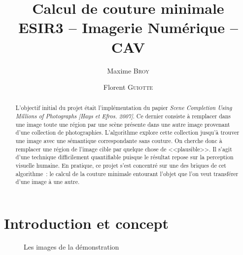 \documentclass[a4paper]{article}
\title{Calcul de couture minimale \\ {\large ESIR3 -- Imagerie Numérique -- CAV}}
\author{Maxime \textsc{Broy} \and Florent \textsc{Guiotte}}
\begin{document}
\maketitle 
\begin{abstract}
L'objectif initial du projet était l'implémentation du papier {\em Scene Completion Using Millions of Photographs [Hays et Efros. 2007]}. 
Ce dernier consiste à remplacer dans une image toute une région par une scène présente dans une autre image provenant d'une collection de photographies. 
L'algorithme explore cette collection jusqu'à trouver une image avec une sémantique correspondante sans couture.
On cherche donc à remplacer une région de l'image cible par quelque chose de <<plausible>>. 
Il s'agit d'une technique difficilement quantifiable puisque le résultat repose sur la perception visuelle humaine. 
En pratique, ce projet s'est concentré sur une des briques de cet algorithme~: 
le calcul de la couture minimale entourant l'objet que l'on veut transférer d'une image à une autre. 
\end{abstract}

\tableofcontents

\section{Introduction et concept}               

\begin{figure}[!ht]%
    \centering
    \hspace{0.030\textwidth}
    \caption{Les images de la démonstration}
    \label{pres}
\end{figure}
\end{document}
